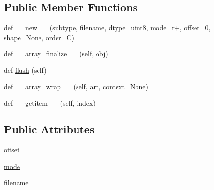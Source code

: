 \subsection*{Public Member Functions}
\begin{DoxyCompactItemize}
\item 
def \hyperlink{classnumpy_1_1core_1_1memmap_1_1memmap_a1381dc62dcae10138a3bb342bfe922a4}{\+\_\+\+\_\+new\+\_\+\+\_\+} (subtype, \hyperlink{classnumpy_1_1core_1_1memmap_1_1memmap_aaf39d85a8ca4308dc1dc17d6bba866c0}{filename}, dtype=uint8, \hyperlink{classnumpy_1_1core_1_1memmap_1_1memmap_a19f056ece80c20f2817e83390b24ef87}{mode}=\textquotesingle{}r+\textquotesingle{}, \hyperlink{classnumpy_1_1core_1_1memmap_1_1memmap_ae552d11a1c1aa9623603f05b65a85bae}{offset}=0, shape=None, order=\textquotesingle{}C\textquotesingle{})
\item 
def \hyperlink{classnumpy_1_1core_1_1memmap_1_1memmap_afa78d47fbad8b8d586ff4207b698054f}{\+\_\+\+\_\+array\+\_\+finalize\+\_\+\+\_\+} (self, obj)
\item 
def \hyperlink{classnumpy_1_1core_1_1memmap_1_1memmap_a584744d69f6cae686962a274fb4d2782}{flush} (self)
\item 
def \hyperlink{classnumpy_1_1core_1_1memmap_1_1memmap_a17c3311888838c62dcdd94fa0ea1169e}{\+\_\+\+\_\+array\+\_\+wrap\+\_\+\+\_\+} (self, arr, context=None)
\item 
def \hyperlink{classnumpy_1_1core_1_1memmap_1_1memmap_a9edb0849df301b01f6d847bf3a533920}{\+\_\+\+\_\+getitem\+\_\+\+\_\+} (self, index)
\end{DoxyCompactItemize}
\subsection*{Public Attributes}
\begin{DoxyCompactItemize}
\item 
\hyperlink{classnumpy_1_1core_1_1memmap_1_1memmap_ae552d11a1c1aa9623603f05b65a85bae}{offset}
\item 
\hyperlink{classnumpy_1_1core_1_1memmap_1_1memmap_a19f056ece80c20f2817e83390b24ef87}{mode}
\item 
\hyperlink{classnumpy_1_1core_1_1memmap_1_1memmap_aaf39d85a8ca4308dc1dc17d6bba866c0}{filename}
\end{DoxyCompactItemize}


